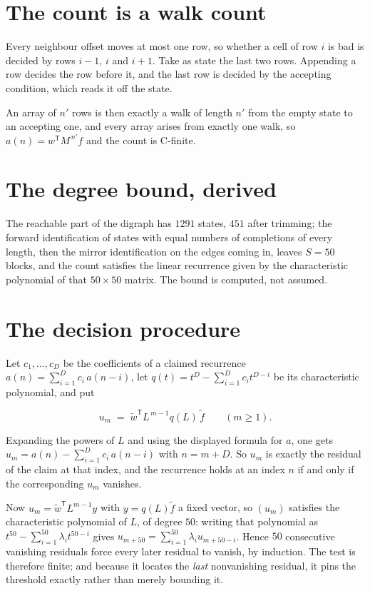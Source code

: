 \documentclass[11pt]{article}
\theoremstyle{definition}
\begin{document}
\section{The count is a walk count}

Every neighbour offset moves at most one row, so whether a cell of row $i$ is bad is decided by rows $i-1$, $i$ and $i+1$. Take as state the last two rows. Appending a row decides the row before it, and the last row is decided by the accepting condition, which reads it off the state.

An array of $n'$ rows is then exactly a walk of length $n'$ from the empty state to an accepting one, and every array arises from exactly one walk, so $a(n) = w^{\mathsf T}M^{\,n'}f$ and the count is C-finite.

\section{The degree bound, derived}

The reachable part of the digraph has $1291$ states, $451$ after trimming; the forward identification of states with equal numbers of completions of every length, then the mirror identification on the edges coming in, leaves $S = 50$ blocks, and the count satisfies the linear recurrence given by the characteristic polynomial of that $50\times50$ matrix. The bound is computed, not assumed.

\section{The decision procedure}

Let $c_1,\dots,c_D$ be the coefficients of a claimed recurrence $a(n) = \sum_{i=1}^{D} c_i\,a(n-i)$, let $q(t) = t^{D} - \sum_{i=1}^{D} c_i t^{D-i}$ be its characteristic polynomial, and put

\[u_m \;=\; \tilde w^{\mathsf T} L^{\,m-1} q(L)\,\tilde f \qquad (m \ge 1).\]

Expanding the powers of $L$ and using the displayed formula for $a$, one gets $u_m = a(n) - \sum_{i=1}^{D} c_i\,a(n-i)$ with $n = m + D$. So $u_m$ is exactly the residual of the claim at that index, and the recurrence holds at an index $n$ if and only if the corresponding $u_m$ vanishes.

Now $u_m = \tilde w^{\mathsf T} L^{m-1} y$ with $y = q(L)\tilde f$ a fixed vector, so $(u_m)$ satisfies the characteristic polynomial of $L$, of degree $50$: writing that polynomial as $t^{50} - \sum_{i=1}^{50} \lambda_i t^{50-i}$ gives $u_{m+50} = \sum_{i=1}^{50} \lambda_i u_{m+50-i}$. Hence $50$ consecutive vanishing residuals force every later residual to vanish, by induction. The test is therefore finite; and because it locates the {\itshape last} nonvanishing residual, it pins the threshold exactly rather than merely bounding it.
\end{document}
